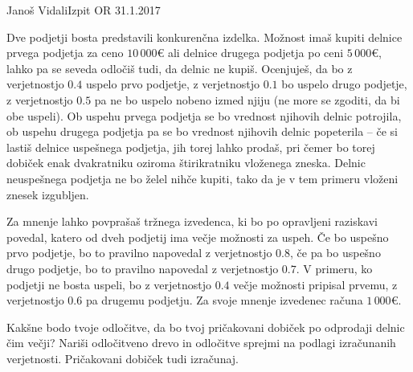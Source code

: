 \begin{naloga}{Janoš Vidali}{Izpit OR 31.1.2017}
\begin{vprasanje}
Dve podjetji bosta predstavili konkurenčna izdelka.
Možnost imaš kupiti delnice prvega podjetja za ceno $10\,000 €$
ali delnice drugega podjetja po ceni $5\,000 €$,
lahko pa se seveda odločiš tudi, da delnic ne kupiš.
Ocenjuješ, da bo z ve\-rjet\-nost\-jo $0.4$ uspelo prvo podjetje,
z verjetnostjo $0.1$ bo uspelo drugo podjetje,
z verjetnostjo $0.5$ pa ne bo uspelo nobeno izmed njiju
(ne more se zgoditi, da bi obe uspeli).
Ob uspehu prvega podjetja se bo vrednost njihovih delnic potrojila,
ob uspehu drugega podjetja pa se bo vrednost njihovih delnic popeterila
-- če si lastiš delnice uspešnega podjetja, jih torej lahko prodaš,
pri čemer bo torej dobiček enak
dvakratniku oziroma štirikratniku vloženega zneska.
Delnic neuspešnega podjetja ne bo želel nihče kupiti,
tako da je v tem primeru vloženi znesek izgubljen.

Za mnenje lahko povprašaš tržnega izvedenca,
ki bo po opravljeni raziskavi povedal,
katero od dveh podjetij ima večje možnosti za uspeh.
Če bo uspešno prvo podjetje, bo to pravilno napovedal z verjetnostjo $0.8$,
če pa bo uspešno drugo podjetje,
bo to pravilno napovedal z verjetnostjo $0.7$.
V primeru, ko podjetji ne bosta uspeli,
bo z verjetnostjo $0.4$ večje možnosti pripisal prvemu,
z verjetnostjo $0.6$ pa drugemu podjetju.
Za svoje mnenje izvedenec računa $1\,000 €$.

Kakšne bodo tvoje odločitve,
da bo tvoj pričakovani dobiček po odprodaji delnic čim večji?
Nariši od\-lo\-čit\-ve\-no drevo
in odločitve sprejmi na podlagi izračunanih verjetnosti.
Pričakovani dobiček tudi izračunaj.
\end{vprasanje}
\begin{odgovor}
\end{odgovor}
\end{naloga}
